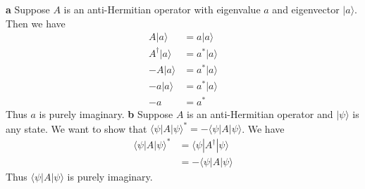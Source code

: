 \documentclass[answers,12pt,addpoints]{exam}
\begin{document}
\begin{questions}
    \begin{solution}
        \textbf{a} 
        Suppose \(A\) is an anti-Hermitian operator with eigenvalue $a$ and eigenvector \(|a \rangle\). Then we have
        \begin{align*}
            A|a\rangle &= a |a\rangle \\
            A^\dagger |a\rangle &= a^* |a\rangle \\
            -A |a\rangle &= a^* |a\rangle \\
            -a |a\rangle &= a^* |a\rangle \\
            -a &= a^*
        \end{align*}
        Thus \(a\) is purely imaginary.
        \textbf{b}
        Suppose \(A\) is an anti-Hermitian operator and \(|\psi\rangle\) is any state. We want to show that \(\langle \psi | A | \psi \rangle^* = -\langle \psi | A | \psi \rangle\). We have
        \begin{align*}
            \langle \psi | A | \psi \rangle^* &= \langle \psi | A^\dagger | \psi \rangle \\
            &= -\langle \psi | A | \psi \rangle
        \end{align*} 
        Thus \(\langle \psi | A | \psi \rangle\) is purely imaginary.
    \end{solution}
\end{questions}
\end{document}
